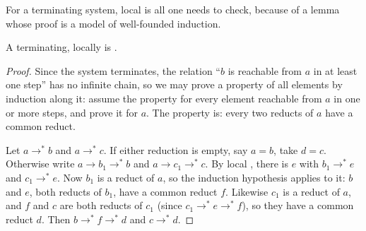 For a terminating system, local  is all one needs to check, because of a lemma whose proof is a model of well-founded induction.

\begin{lemma}[Newman]\label{lem:b3:lambda-calculus:newman}
A terminating, locally   is .
\end{lemma}

\begin{proof}
Since the system terminates, the relation ``$b$ is reachable from $a$ in at least one step'' has no infinite chain, so we may prove a property of all elements by induction along it: assume the property for every element reachable from $a$ in one or more steps, and prove it for $a$. The property is: every two reducts of $a$ have a common reduct.

Let $a \to^* b$ and $a \to^* c$. If either reduction is empty, say $a = b$, take $d = c$. Otherwise write $a \to b_1 \to^* b$ and $a \to c_1 \to^* c$. By local , there is $e$ with $b_1 \to^* e$ and $c_1 \to^* e$. Now $b_1$ is a reduct of $a$, so the induction hypothesis applies to it: $b$ and $e$, both reducts of $b_1$, have a common reduct $f$. Likewise $c_1$ is a reduct of $a$, and $f$ and $c$ are both reducts of $c_1$ (since $c_1 \to^* e \to^* f$), so they have a common reduct $d$. Then $b \to^* f \to^* d$ and $c \to^* d$.
\end{proof}

